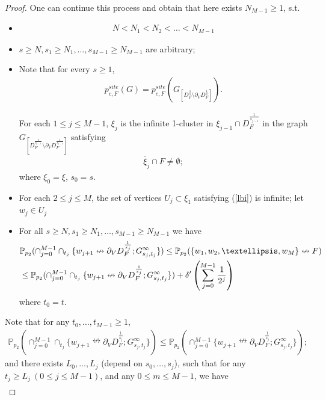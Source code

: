 \documentclass[10pt,a4paper]{amsart}
\newcommand\PP{{\mathbb P}}
\newcommand\ol{\overline}
\begin{document}
\begin{proof}
One can continue this process and obtain that here exists $N_{M-1}\geq 1$, s.t.
\begin{itemize}
\item \begin{align*}
N<N_1<N_2<\ldots< N_{M-1}
\end{align*}
\item $s\geq N,s_1\geq N_1,\ldots,s_{M-1}\geq N_{M-1}$ are arbitrary;
\item Note that for every $s\geq 1$,
\begin{align*}
p_{c,F}^{site}(G)=p_{c,F}^{site}\left(G_{\left[D_{F}^{\frac{1}{s}}\setminus \partial_V D_{F}^{\frac{1}{s}} \right]}\right).
\end{align*}

For each $1\leq j\leq M-1$, $\xi_j$ is the infinite 1-cluster in $\xi_{j-1}\cap D_F^{\frac{1}{s_{j-1}}}$ in the graph $G_{\left[D_{F}^{\frac{1}{s_{j-1}}}\setminus \partial_V D_{F}^{\frac{1}{s_{j-1}}} \right]}$ satisfying
\begin{align*}
\ol{\xi}_j\cap F\neq\emptyset;
\end{align*}    
where $\xi_0=\xi$, $s_0=s$.
\item For each $2\leq j\leq M$, the set of vertices $U_j\subset \xi_1$ satisfying (\ref{lbi}) is infinite; let $w_j\in U_j$
\item For all $s\geq N,s_1\geq N_1,\ldots,s_{M-1}\geq N_{M-1}$ we have
\begin{align}
\label{tc2}&\PP_{p_2}(\cap_{j=0}^{M-1}\cap_{t_j}\{w_{j+1}\nleftrightarrow \partial_V D_F^{\frac{1}{s_j}};G_{s_j,t_j}^{\infty}\})\leq \PP_{p_2}(\{w_1,w_2,\ldots,w_M\}\nleftrightarrow F)\\
&\leq \PP_{p_2}(\cap_{j=0}^{M-1}\cap_{t_j}\{w_{j+1}\nleftrightarrow \partial_V D_F^{\frac{1}{s_j}};G_{s_j,t_j}^{\infty}\})+\delta'\left(\sum_{j=0}^{M-1}\frac{1}{2^j}
\right)\notag
\end{align}
where $t_0=t$.
\end{itemize}
Note that for any $t_0,\ldots,t_{M-1}\geq 1$,
\begin{align*}
\PP_{p_2}(\cap_{j=0}^{M-1}\cap_{t_j}\{w_{j+1}\nleftrightarrow \partial_V D_F^{\frac{1}{s_j}};G_{s_j,t_j}^{\infty}\})
\leq \PP_{p_2}(\cap_{j=0}^{M-1}\{w_{j+1}\nleftrightarrow \partial_V D_F^{\frac{1}{s_j}};G_{s_j,t_j}^{\infty}\});
\end{align*}
and there exists $L_0,\ldots,L_j$ (depend on $s_0,\ldots,s_j$), such that for any $t_j\geq L_j\ (0\leq j\leq M-1)$, and any $0\le m\leq M-1$, we have
\begin{align}

\end{align}
\end{proof}
\end{document}
